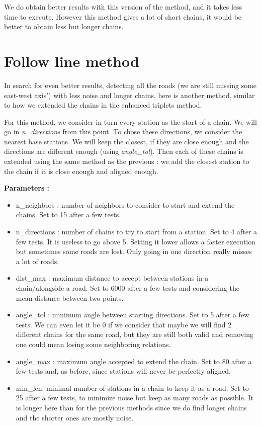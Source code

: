 \documentclass[main.tex]{subfiles}
\begin{document}
We do obtain better results with this version of the method, and it takes less time to execute. However this method gives a lot of short chains, it would be better to obtain less but longer chains.



\section{Follow line method}

In search for even better results, detecting all the roads (we are still missing some east-west axis') with less noise and longer chains, here is another method, similar to how we extended the chains in the enhanced triplets method. 

For this method, we consider in turn every station as the start of a chain. We will go in \textit{n\_directions} from this point. To chose these directions, we consider the nearest base stations. We will keep the closest, if they are close enough and the directions are different enough (using \textit{angle\_tol}). Then each of these chains is extended using the same method as the previous : we add the closest station to the chain if it is close enough and aligned enough.

\textbf{Parameters : }
\begin{itemize}
    \item n\_neighbors : number of neighbors to consider to start and extend the chains. Set to 15 after a few tests.
    \item n\_directions : number of chains to try to start from a station. Set to 4 after a few tests. It is useless to go above 5. Setting it lower allows a faster execution but sometimes some roads are lost. Only going in one direction really misses a lot of roads.
    \item dist\_max : maximum distance to accept between stations in a chain/alongside a road. Set to 6000 after a few tests and considering the mean distance between two points.
    \item angle\_tol : minimum angle between starting directions. Set to 5 after a few tests. We can even let it be 0 if we consider that maybe we will find 2 different chains for the same road, but they are still both valid and removing one could mean losing some neighboring relations.
    \item angle\_max : maximum angle accepted to extend the chain. Set to 80 after a few tests and, as before, since stations will never be perfectly aligned.
    \item min\_len: minimal number of stations in a chain to keep it as a road. Set to 25 after a few tests, to minimize noise but keep as many roads as possible. It is longer here than for the previous methods since we do find longer chains and the shorter ones are mostly noise.
\end{itemize}
\end{document}
